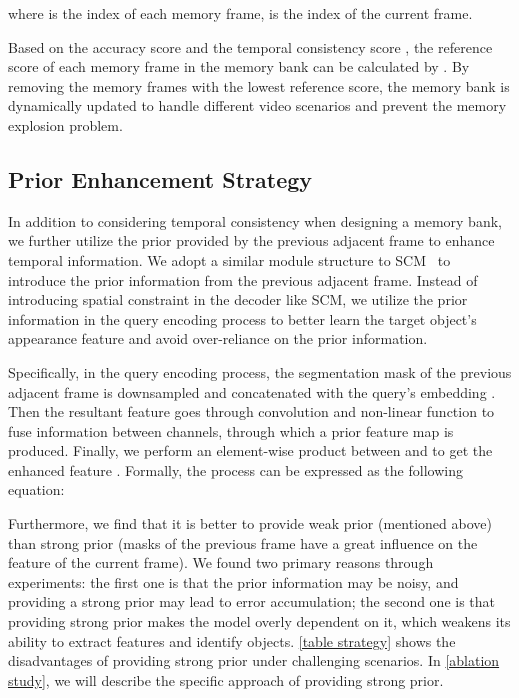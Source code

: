 \documentclass[runningheads]{llncs}
\begin{document}
    where  is the index of each memory frame,  is the index of the current frame.
    
    Based on the accuracy score  and the temporal consistency score , the reference score of each memory frame in the memory bank can be calculated by .
By removing the memory frames with the lowest reference score, the memory bank is dynamically updated to handle different video scenarios and prevent the memory explosion problem.


    \subsection{Prior Enhancement Strategy} 
    
    In addition to considering temporal consistency when designing a memory bank, we further utilize the prior provided by the previous adjacent frame to enhance temporal information.
    We adopt a similar module structure to SCM~\cite{davis1st} to introduce the prior information from the previous adjacent frame.
    Instead of introducing spatial constraint in the decoder like SCM, we utilize the prior information in the query encoding process to better learn the target object's appearance feature and avoid over-reliance on the prior information.
    
    Specifically, in the query encoding process, the segmentation mask of the previous adjacent frame  is downsampled and concatenated with the query's embedding .
    Then the resultant feature goes through convolution and non-linear function to fuse information between channels, through which a prior feature map  is produced.
    Finally, we perform an element-wise product between  and  to get the enhanced feature . Formally, the process can be expressed as the following equation:
    
    

Furthermore, we find that it is better to provide weak prior (mentioned above) than strong prior (masks of the previous frame have a great influence on the feature of the current frame).
    We found two primary reasons through experiments: the first one is that the prior information may be noisy, and providing a strong prior may lead to error accumulation; 
    the second one is that providing strong prior makes the model overly dependent on it, which weakens its ability to extract features and identify objects. 
    \cref{table strategy} shows the disadvantages of providing strong prior under challenging scenarios. 
    In \cref{ablation study}, we will describe the specific approach of providing strong prior.
\end{document}
